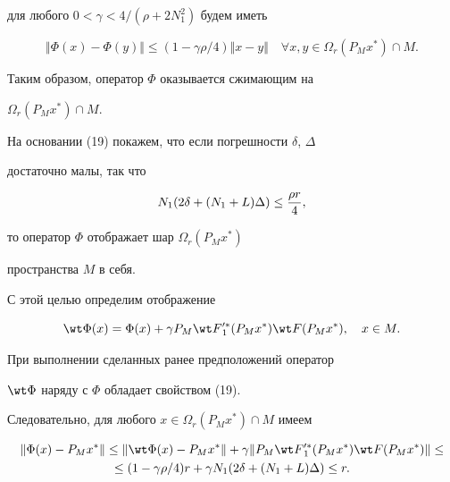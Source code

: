 для любого $0<\gamma< 4/(\rho+2 N_1^2)$ будем иметь


\begin{equation}


\Vert \Phi(x)- \Phi(y) \Vert \leq (1-\gamma \rho/4)


\Vert x-y\Vert \quad


\forall x, y \in \Omega_r (P_M x^*) \cap M.


\end{equation}


Таким образом, оператор $\Phi$ оказывается сжимающим на


$\Omega_r (P_M x^*) \cap M$.





На основании (19) покажем, что если погрешности $\delta$, $\Delta$


достаточно малы, так что


\begin{equation}


N_1 (2\delta +(N_1+L) \Delta) \leq {{\rho r}\over{4}},


\end{equation}


то оператор $\Phi$ отображает шар $\Omega_r (P_M x^*)$


пространства $M$ в себя.


С этой целью определим отображение


\begin{equation}


{\wt \Phi}(x)=\Phi(x)+


\gamma P_M {\wt F}{}_1^{\prime *}(P_M x^*)


{\wt F} (P_M x^*), \quad x \in M.


\end{equation}


При выполнении сделанных ранее предположений оператор


${\wt \Phi}$ наряду с $\Phi$ обладает свойством (19).


Следовательно, для любого $x \in \Omega_r (P_M x^*) \cap M$ имеем


\begin{multline*}


\Vert \Phi(x) -P_M x^* \Vert \leq


\Vert {\wt \Phi}(x) -P_M x^* \Vert +


\gamma \Vert P_M {\wt F}{}_1^{\prime *}(P_M x^*)


{\wt F}(P_M x^*) \Vert \leq \\


%


\leq (1-\gamma \rho/4)r+ \gamma N_1 (2\delta +


(N_1+L) \Delta) \leq r.


\end{multline*}


